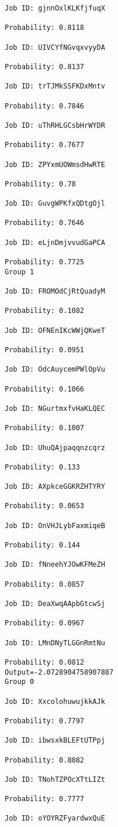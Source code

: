 \documentclass[11pt]{article}
\begin{document}
\begin{Verbatim}[commandchars=\\\{\}]
Job ID: gjnnOxlKLKfjfuqX

Probability: 0.8118

Job ID: UIVCYfNGvqxvyyDA

Probability: 0.8137

Job ID: trTJMkSSFKDxMntv

Probability: 0.7846

Job ID: uThRHLGCsbHrWYDR

Probability: 0.7677

Job ID: ZPYxmUOWmsdHwRTE

Probability: 0.78

Job ID: GuvgWPKfxQDtgOjl

Probability: 0.7646

Job ID: eLjnDmjvvudGaPCA

Probability: 0.7725
Group 1

Job ID: FROMOdCjRtQuadyM

Probability: 0.1082

Job ID: OFNEnIKcWWjQKweT

Probability: 0.0951

Job ID: OdcAuycemPWlOpVu

Probability: 0.1066

Job ID: NGurtmxfvHaKLQEC

Probability: 0.1007

Job ID: UhuQAjpaqqnzcqrz

Probability: 0.133

Job ID: AXpkceGGKRZHTYRY

Probability: 0.0653

Job ID: OnVHJLybFaxmiqeB

Probability: 0.144

Job ID: fNneehYJOwKFMeZH

Probability: 0.0857

Job ID: DeaXwqAApbGtcwSj

Probability: 0.0967

Job ID: LMnDNyTLGGnRmtNu

Probability: 0.0812
Output=-2.0728904758907887
Group 0

Job ID: XxcolohuwujkkAJk

Probability: 0.7797

Job ID: ibwsxkBLEFtUTPpj

Probability: 0.8082

Job ID: TNohTZPOcXTtLIZt

Probability: 0.7777

Job ID: oYOYRZFyardwxQuE


\end{Verbatim}
\end{document}
